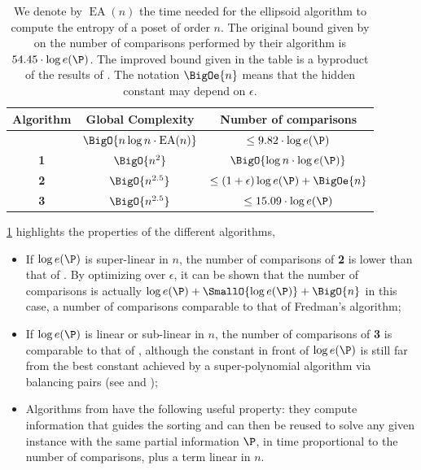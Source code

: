 \begin{table}
	\begin{center}
	\caption{We denote by $\operatorname{EA}(n)$ the time needed for the ellipsoid algorithm
to compute the entropy of a poset of order $n$. The original bound given by
\citet*{kahn:1995} on the number of comparisons performed by their algorithm is
$54.45 \cdot \log e(\P)$. The improved bound given in the table is a byproduct
of the results of \citet*{cardinal:2013}. The notation $\BigOe{n}$ means
that the hidden constant may depend on $\epsilon$.}
	\label{tree:supi:table/jcardin}
	\begin{tabular}{|c|c|c|}

	\hline
	Algorithm & Global Complexity & Number of comparisons\\\hline\hline
	\citet*{kahn:1995} & $\BigO{n \log n \cdot \operatorname{EA}(n)}$ & $\leq 9.82 \cdot \log
e(\P)$\\\hline\hline
	\citet*{cardinal:2013} \textbf{1} & $ \BigO{n^{2}} $ & $\BigO{\log n \cdot
\log e(\P)}$ \\\hline
	\citet*{cardinal:2013} \textbf{2} & $ \BigO{n^{2.5}} $ & $\leq (1 +
\epsilon) \log e(\P) + \BigOe{n}$ \\\hline
	\citet*{cardinal:2013} \textbf{3} & $ \BigO{n^{2.5}} $ & $\leq 15.09 \cdot
\log e(\P)$ \\\hline

	\end{tabular}
	\end{center}
\end{table}


\ref{tree:supi:table/jcardin} highlights the properties of the different
algorithms, \ie
\begin{itemize}

\item If $\log e(\P)$ is super-linear in $n$, the number of comparisons of
\citet*{cardinal:2013} \textbf{2} is lower than that of \citet*{kahn:1995}. By
optimizing over $\epsilon$, it can be shown that the number of comparisons is
actually $\log e(\P) + \SmallO{\log e(\P)} + \BigO{n}$ in this case, a number of
comparisons comparable to that of Fredman’s algorithm;

\item If $\log e(\P)$ is linear or sub-linear in $n$, the number of comparisons
of \citet*{cardinal:2013} \textbf{3} is comparable to that of
\citet*{kahn:1995}, although the constant in front of $\log e(\P)$ is still far
from the best constant achieved by a super-polynomial algorithm via balancing
pairs (see \citet*{brightwell1995balancing} and
\citet*{brightwell1999balanced});

\item Algorithms from \citet*{cardinal:2013} have the following useful
property: they compute information that guides the sorting and can then be
reused to solve any given instance with the same partial information $\P$, in
time proportional to the number of comparisons, plus a term linear in $n$.

\end{itemize}

